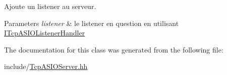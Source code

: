 Ajoute un listener au serveur. 


\begin{DoxyParams}{Parameters}
{\em listener} & le listener en question en utilisant \hyperlink{classmognetwork_1_1_i_tcp_a_s_i_o_listener_handler}{I\-Tcp\-A\-S\-I\-O\-Listener\-Handler} \\
\hline
\end{DoxyParams}


The documentation for this class was generated from the following file\-:\begin{DoxyCompactItemize}
\item 
include/\hyperlink{_tcp_a_s_i_o_server_8hh}{Tcp\-A\-S\-I\-O\-Server.\-hh}\end{DoxyCompactItemize}

